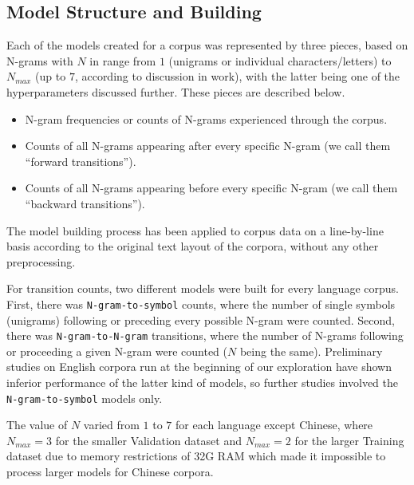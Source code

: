 \documentclass[11pt]{article}
\begin{document}
\subsection{\label{sec:s1}Model Structure and Building}

Each of the models created for a corpus was represented by three pieces, based on N-grams with $N$ in range from $1$ (unigrams or individual characters/letters) to $N_{max}$ (up to $7$, according to discussion in  work), with the latter being one of the hyperparameters discussed further. These pieces are described below.
\begin{itemize}
\item N-gram frequencies or counts of N-grams experienced through the corpus.
\item Counts of all N-grams appearing after every specific N-gram (we call them “forward transitions”).   
\item Counts of all N-grams appearing before every specific N-gram (we call them “backward transitions”).
\end{itemize}
The model building process has been applied to corpus data on a line-by-line basis according to the original text layout of the corpora, without any other preprocessing.

For transition counts, two different models were built for every language corpus. First, there was \texttt{N-gram-to-symbol} counts, where the number of single symbols (unigrams) following or preceding every possible N-gram were counted. Second, there was \texttt{N-gram-to-N-gram} transitions, where the number of N-grams following or proceeding a given N-gram were counted ($N$ being the same). Preliminary studies on English corpora run at the beginning of our exploration have shown inferior performance of the latter kind of models, so further studies involved the \texttt{N-gram-to-symbol} models only.

The value of $N$ varied from $1$ to $7$ for each language except Chinese, where $N_{max}=3$ for the smaller Validation dataset and $N_{max}=2$ for the larger Training dataset due to memory restrictions of 32G RAM which made it impossible to process larger models for Chinese corpora. 
\end{document}
